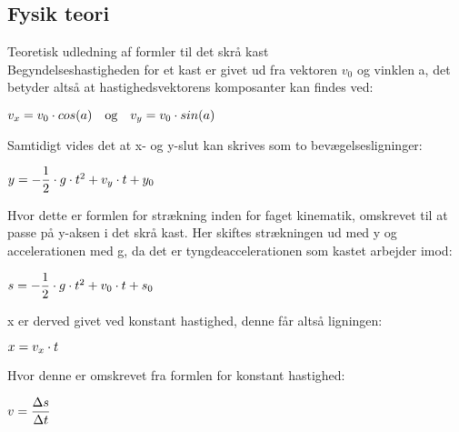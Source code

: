 \subsection{Fysik teori}
Teoretisk udledning af formler til det skrå kast\\
Begyndelseshastigheden for et kast er givet ud fra vektoren $v_{0}$ og vinklen a, det betyder altså at hastighedsvektorens komposanter kan findes ved:\\

\begin{center}
\begin{math}
\centering
v_{x} = v_{0} \cdot cos(a) \quad \textrm{og} \quad v_{y} = v_{0} \cdot sin(a)
\end{math}
\end{center}

Samtidigt vides det at x- og y-slut kan skrives som to bevægelsesligninger:\\

\begin{center}
\begin{math}
\centering
y = -\dfrac{1}{2} \cdot g \cdot t^{2} + v_{y} \cdot t + y_{0}
\end{math}
\end{center}



Hvor dette er formlen for strækning inden for faget kinematik, omskrevet til at passe på y-aksen i det skrå kast. Her skiftes strækningen ud med y og accelerationen med g, da det er tyngdeaccelerationen som kastet arbejder imod:\\

\begin{center}
\begin{math}
\centering
s = -\dfrac{1}{2} \cdot g \cdot t^{2} + v_{0} \cdot t + s_{0} 
\end{math}
\end{center}

x er derved givet ved konstant hastighed, denne får altså ligningen:\\

\begin{center}
\begin{math}
\centering
x = v_{x} \cdot t
\end{math}
\end{center}

Hvor denne er omskrevet fra formlen for konstant hastighed:\\

\begin{center}
\begin{math}
\centering
v = \dfrac{\Delta s}{\Delta t}
\end{math}
\end{center}




